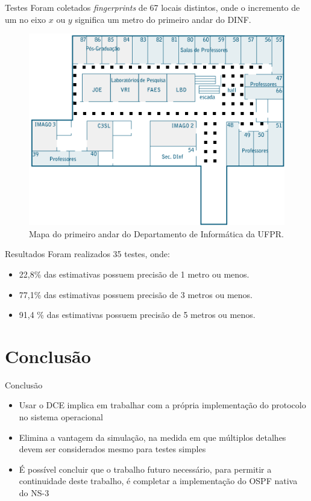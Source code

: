 \documentclass{beamer}
\newlength{\wideitemsep}
\let\olditem\item
\renewcommand{\item}{\setlength{\itemsep}{\wideitemsep}\olditem}
\begin{document}
\begin{frame}{Testes}
Foram coletados \textit{fingerprints} de 67 locais distintos,
  onde o incremento de um no eixo $x$ ou $y$ significa um metro do primeiro andar do DINF.
   
   \begin{figure}[hbt]
  \centering
  \includegraphics[scale=0.4]{../images/TTmapadinf_andar1_492x327.png}
  \caption{Mapa do primeiro andar do Departamento de Informática da UFPR.}
  \label{fig:mapaDinf}
  \end{figure}
\end{frame}

\begin{frame}{Resultados}
 Foram realizados 35 testes, onde:
  \begin{itemize}
      \item 22,8\% das estimativas possuem precisão de 1 metro ou menos.
      \item 77,1\% das estimativas possuem precisão de 3 metros ou menos.
      \item 91,4 \% das estimativas possuem precisão de 5 metros ou menos.
     \end{itemize}
\end{frame}

\section{Conclusão}
\begin{frame}{Conclusão}
\begin{itemize}
 \item Usar o DCE implica em trabalhar com a própria implementação do protocolo no sistema operacional %
 \item Elimina a vantagem da simulação, na medida em que múltiplos detalhes devem ser considerados mesmo para testes simples %
 \item É possível concluir que o trabalho futuro necessário, para permitir a continuidade deste trabalho, é completar a implementação do OSPF nativa do NS-3 %
\end{itemize}
\end{frame}
\end{document}
